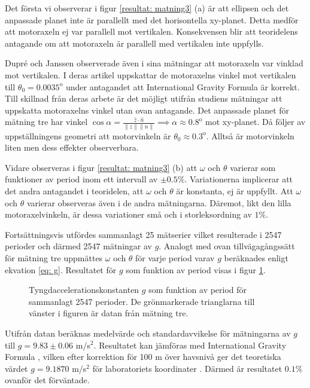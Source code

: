 \documentclass[12pt,a4paper]{article}
\newlength\fheight
\begin{document}
Det första vi observerar i figur \ref{resultat: matning3} (a) är att ellipsen och det anpassade planet inte är parallellt med det horisontella xy-planet. Detta medför att motoraxeln ej var parallell mot vertikalen. Konsekvensen blir att teoridelens antagande om att motoraxeln är parallell med vertikalen inte uppfylls. 

Dupré och Janssen observerade även i sina mätningar att motoraxeln var vinklad mot vertikalen. I deras artikel uppskattar de motoraxelns vinkel mot vertikalen till $\theta_0 = 0.0035^\text{o}$ under antagandet att International Gravity Formula \cite{gravformula} är korrekt. Till skillnad från deras arbete är det möjligt utifrån studiens mätningar att uppskatta motoraxelns vinkel utan ovan antagande. Det anpassade planet för mätning tre har vinkel $\cos \alpha = \frac{\hat{z} \cdot \hat{n}}{\lVert z \rVert \lVert n \rVert} \implies \alpha \approx 0.8^\text{o}$ mot xy-planet. Då följer av uppställningens geometri att motorvinkeln är $\theta_0 \approx 0.3^\text{o}$. Alltså är motorvinkeln liten men dess effekter observerbara.

Vidare observeras i figur \ref{resultat: matning3} (b) att $\omega$ och $\theta$ varierar som funktioner av period inom ett intervall av $\pm 0.5 \%$. Variationerna implicerar att det andra antagandet i teoridelen, att $\omega$ och $\theta$ är konstanta, ej är uppfyllt. Att $\omega$ och $\theta$ varierar observeras även i de andra mätningarna. Däremot, likt den lilla motoraxelvinkeln, är dessa variationer små och i storleksordning av $1\%$. 

Fortsättningsvis utfördes sammanlagt 25 mätserier vilket resulterade i 2547 perioder och därmed 2547 mätningar av $g$. Analogt med ovan tillvägagångssätt för mätning tre uppmättes  $\omega$ och $\theta$ för varje period varav $g$ beräknades enligt ekvation \eqref{eq: g}. Resultatet för $g$ som funktion av period visas i figur \ref{fig: gTotal}.


\begin{figure}[H]
    \centering
    \setlength\fheight{2in}
    
    \caption{Tyngdaccelerationskonstanten $g$ som funktion av period för sammanlagt 2547 perioder. De grönmarkerade trianglarna till vänster i figuren är datan från mätning tre. }
    \label{fig: gTotal}
\end{figure}
Utifrån datan beräknas medelvärde och standardavvikelse för mätningarna av $g$ till $g = 9.83 \pm 0.06$ m/s$^2$.  Resultatet kan jämföras med International Gravity Formula \cite{gravformula}, vilken efter korrektion för 100 m över havsnivå ger det teoretiska värdet $g = 9.1870$ m/s$^2$ för laboratoriets koordinater . Därmed är resultatet $0.1\%$ ovanför det förväntade.
\end{document}
